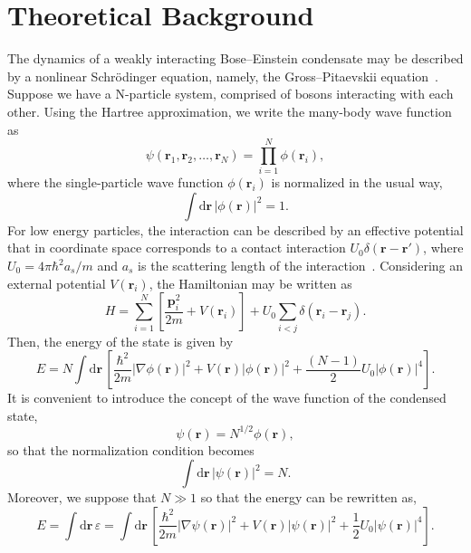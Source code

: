 \section{Theoretical Background}
The dynamics of a weakly interacting Bose--Einstein condensate may be described by a nonlinear Schr\"odinger equation, namely, the Gross--Pitaevskii equation~\citep{pethick2002bose,DGPS99,LSA12}. Suppose we have a N-particle system, comprised of bosons interacting with each other. Using the Hartree approximation, we write the many-body wave function as
\begin{equation}
\psi(\textbf{r}_1, \textbf{r}_2,\ldots, \textbf{r}_N) = \prod_{i=1}^N \phi(\textbf{r}_i),
\end{equation}
where the single-particle wave function $\phi(\textbf{r}_i)$ is normalized in the usual way,
\begin{equation}
\int \mathrm{d}\textbf{r} \, |\phi(\textbf{r})|^2 = 1.
\end{equation} 
For low energy particles, the interaction can be described by an effective potential
that in coordinate space corresponds to a contact interaction $U_0 \delta(\textbf{r} - \textbf{r}')$, where $U_0 = 4 \pi \hbar^2 a_s / m$ and $a_s$ is the scattering length of the interaction~\citep{pethick2002bose}. Considering an external potential $V(\textbf{r}_i)$, the Hamiltonian may be written as
\begin{equation}
H = \sum_{i=1}^N \left[ \frac{\textbf{p}_i^2}{2 m} + V(\textbf{r}_i) \right] + U_0 \sum_{i<j} \delta(\textbf{r}_i - \textbf{r}_j).
\end{equation}
Then, the energy of the state is given by
\begin{equation}
E =  N \int \mathrm{d} \textbf{r} \, \left[ \frac{\hbar^2}{2m} |\nabla \phi(\textbf{r}) |^2 + V(\textbf{r}) |\phi(\textbf{r})|^2 + \frac{(N-1)}{2} U_0 |\phi(\textbf{r})|^4 \right].
\end{equation} 
It is convenient to introduce the concept of the wave function of the condensed state,
\begin{equation}
\psi(\textbf{r}) = N^{1/2} \phi(\textbf{r}),
\end{equation}
so that the normalization condition becomes
\begin{equation} \label{eq:normalization-N}
\int \mathrm{d}\textbf{r} \, |\psi(\textbf{r})|^2 = N.
\end{equation}
Moreover, we suppose that $N \gg 1$ so that the energy can be rewritten as,
\begin{equation}
E = \int \mathrm{d} \textbf{r} \, \varepsilon  = \int \mathrm{d} \textbf{r} \, \left[ \frac{\hbar^2}{2m} |\nabla \psi(\textbf{r}) |^2 + V(\textbf{r}) |\psi(\textbf{r})|^2 + \frac{1}{2} U_0 |\psi(\textbf{r})|^4 \right].
\end{equation}
